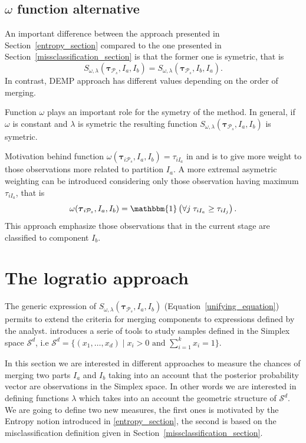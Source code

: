\documentclass[submit]{smj}
\theoremstyle{definition}
\newcommand{\m}[1]{\boldsymbol{#1}}
\begin{document}
\subsection{$\omega$ function alternative}


An important difference between the approach presented in Section~\ref{entropy_section} \citep{baudry2010combining} compared to the one presented in Section~\ref{missclassification_section} \citep{hennig2010methods} is that the former one is symetric, that is
\[
S_{\omega, \lambda}( \m\tau_{\mathcal{P}_s},  I_a,  I_b) = S_{\omega, \lambda}( \m\tau_{\mathcal{P}_s},  I_b,  I_a).
\]
In contrast, DEMP approach has different values depending on the order of merging.

Function $\omega$ plays an important role for the symetry of the method. In general, if $\omega$ is constant and $\lambda$ is symetric the resulting function $S_{\omega, \lambda}( \m\tau_{\mathcal{P}_s},  I_a,  I_b)$ is symetric.

Motivation behind function $\omega(\m\tau_{i \mathcal{P}_s},  I_a,  I_b) = \tau_{iI_a}$ in \cite{hennig2010methods} and \cite{longford2014}  is to give more weight to those observations more related to partition $I_a$. A more extremal asymetric weighting can be introduced considering only those observation having maximum $ \tau_{iI_a}$, that is
\[
\omega(\m\tau_{i \mathcal{P}_s},  I_a,  I_b) = \mathbbm{1}\left( \forall j\; \tau_{i I_{a}} \geq \tau_{iI_j} \right).
\]
This approach emphasize those observations that in the current stage are classified to component $I_b$.


\section{The logratio approach}\label{logratio_section}

The generic expression of $S_{\omega, \lambda}( \m\tau_{\mathcal{P}_s},  I_a,  I_b)$ (Equation~\ref{unifying_equation}) permits to extend the criteria for merging components to expressions defined by the analyst. \cite{aitchison1986statistical} introduces a serie of tools to study samples defined in the Simplex space $\mathcal{S}^d$, i.e $\mathcal{S}^d = \{ (x_1,\dots, x_d) \;|\; x_i > 0 \text{ and } \sum_{i=1}^k x_i = 1 \}$. 

In this section we are interested in different approaches to measure the chances of merging two parts $I_a$ and $I_b$ taking into an account that the posterior probability vector are observations in the Simplex space. In other words we are interested in defining functions $\lambda$ which takes into an account the geometric structure of $\mathcal{S}^d$. We are going to define two new measures, the first ones is motivated by the Entropy notion introduced in \ref{entropy_section}, the second is based on the misclassification definition given in Section~\ref{missclassification_section}.
\end{document}
